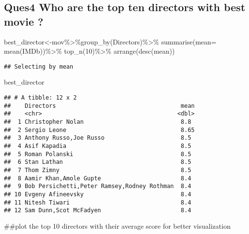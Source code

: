 \documentclass[
]{article}
\newenvironment{Shaded}{\begin{snugshade}}{\end{snugshade}}
\newcommand{\AttributeTok}[1]{\textcolor[rgb]{0.77,0.63,0.00}{#1}}
\newcommand{\DecValTok}[1]{\textcolor[rgb]{0.00,0.00,0.81}{#1}}
\newcommand{\FunctionTok}[1]{\textcolor[rgb]{0.00,0.00,0.00}{#1}}
\newcommand{\NormalTok}[1]{#1}
\newcommand{\OtherTok}[1]{\textcolor[rgb]{0.56,0.35,0.01}{#1}}
\newcommand{\SpecialCharTok}[1]{\textcolor[rgb]{0.00,0.00,0.00}{#1}}
\begin{document}
\hypertarget{q4}{%
\subsection{Ques4 Who are the top ten directors with best movie
?}\label{q4}}

\begin{Shaded}
\begin{Highlighting}[]
\NormalTok{best\_director}\OtherTok{\textless{}{-}}\NormalTok{mov}\SpecialCharTok{\%\textgreater{}\%}\FunctionTok{group\_by}\NormalTok{(Directors)}\SpecialCharTok{\%\textgreater{}\%}
  \FunctionTok{summarise}\NormalTok{(}\AttributeTok{mean=} \FunctionTok{mean}\NormalTok{(IMDb))}\SpecialCharTok{\%\textgreater{}\%}
  \FunctionTok{top\_n}\NormalTok{(}\DecValTok{10}\NormalTok{)}\SpecialCharTok{\%\textgreater{}\%}
  \FunctionTok{arrange}\NormalTok{(}\FunctionTok{desc}\NormalTok{(mean))}
\end{Highlighting}
\end{Shaded}

\begin{verbatim}
## Selecting by mean
\end{verbatim}

\begin{Shaded}
\begin{Highlighting}[]
\NormalTok{best\_director}
\end{Highlighting}
\end{Shaded}

\begin{verbatim}
## # A tibble: 12 x 2
##    Directors                                    mean
##    <chr>                                       <dbl>
##  1 Christopher Nolan                            8.8 
##  2 Sergio Leone                                 8.65
##  3 Anthony Russo,Joe Russo                      8.5 
##  4 Asif Kapadia                                 8.5 
##  5 Roman Polanski                               8.5 
##  6 Stan Lathan                                  8.5 
##  7 Thom Zimny                                   8.5 
##  8 Aamir Khan,Amole Gupte                       8.4 
##  9 Bob Persichetti,Peter Ramsey,Rodney Rothman  8.4 
## 10 Evgeny Afineevsky                            8.4 
## 11 Nitesh Tiwari                                8.4 
## 12 Sam Dunn,Scot McFadyen                       8.4
\end{verbatim}

\#\#plot the top 10 directors with their average score for better
visualization
\end{document}
